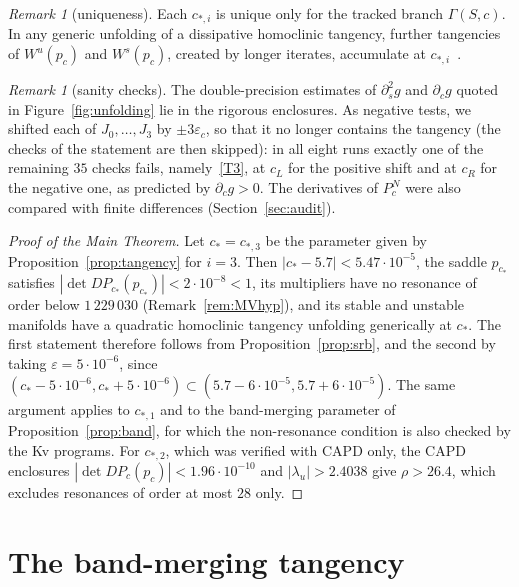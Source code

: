 \documentclass[11pt]{amsart}
\theoremstyle{definition}
\theoremstyle{remark}
\newtheorem{remark}[thm]{Remark}
\newcommand{\Wu}{W^u}
\newcommand{\Ws}{W^s}
\newcommand{\cs}{c_*}
\begin{document}
\begin{remark}[uniqueness]
Each $c_{*,i}$ is unique only for the tracked branch $\Gamma(S,c)$. In any generic unfolding of a dissipative
homoclinic tangency, further tangencies of $\Wu(p_c)$ and $\Ws(p_c)$, created by longer iterates, accumulate
at $c_{*,i}$~\cite{PT93}.
\end{remark}

\begin{remark}[sanity checks]\label{rem:sanity}
The double-precision estimates of $\partial_s^2g$ and $\partial_cg$ quoted in Figure~\ref{fig:unfolding} lie in
the rigorous enclosures. As negative tests, we shifted each of $J_0,\dots,J_3$ by $\pm3\varepsilon_c$, so that it
no longer contains the tangency (the checks of the statement are then skipped): in all eight runs exactly
one of the remaining $35$ checks fails, namely~\ref{T3}, at $c_L$ for the positive shift and at $c_R$ for the
negative one, as predicted by $\partial_cg>0$. The derivatives of $P^N_c$ were also compared with finite
differences (Section~\ref{sec:audit}).
\end{remark}

\begin{proof}[Proof of the Main Theorem]
Let $\cs=c_{*,3}$ be the parameter given by Proposition~\ref{prop:tangency} for $i=3$. Then
$|\cs-5.7|<5.47\cdot10^{-5}$, the saddle $p_{\cs}$ satisfies $|\det DP_{\cs}(p_{\cs})|<2\cdot10^{-8}<1$, its
multipliers have no resonance of order below $1\,229\,030$ (Remark~\ref{rem:MVhyp}), and its stable and unstable
manifolds have a quadratic homoclinic tangency unfolding generically at $\cs$. The first
statement therefore follows from Proposition~\ref{prop:srb}, and the second by taking
$\varepsilon=5\cdot10^{-6}$, since $(\cs-5\cdot10^{-6},\cs+5\cdot10^{-6})\subset(5.7-6\cdot10^{-5},5.7+6\cdot10^{-5})$.
The same argument applies to $c_{*,1}$ and to the band-merging parameter of Proposition~\ref{prop:band}, for
which the non-resonance condition is also checked by the Kv programs. For $c_{*,2}$, which was verified with CAPD
only, the CAPD enclosures $|\det DP_c(p_c)|<1.96\cdot10^{-10}$ and $|\lambda_u|>2.4038$ give $\rho>26.4$, which
excludes resonances of order at most $28$ only.
\end{proof}

\section{The band-merging tangency}\label{sec:band}
\end{document}
